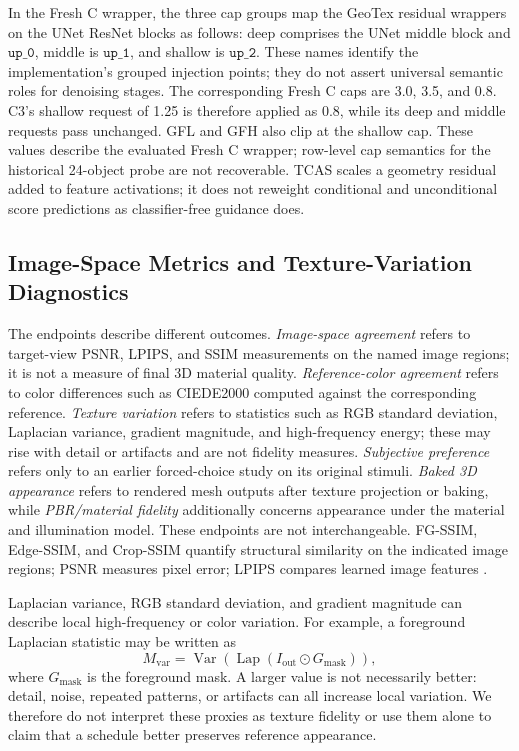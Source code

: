 \documentclass[times,twocolumn,final]{elsarticle}
\begin{document}
In the Fresh C wrapper, the three cap groups map the GeoTex residual wrappers on the UNet ResNet blocks as follows: deep comprises the UNet middle block and $\texttt{up\_0}$, middle is $\texttt{up\_1}$, and shallow is $\texttt{up\_2}$. These names identify the implementation's grouped injection points; they do not assert universal semantic roles for denoising stages. The corresponding Fresh C caps are 3.0, 3.5, and 0.8. C3's shallow request of 1.25 is therefore applied as 0.8, while its deep and middle requests pass unchanged. GFL and GFH also clip at the shallow cap. These values describe the evaluated Fresh C wrapper; row-level cap semantics for the historical 24-object probe are not recoverable. TCAS scales a geometry residual added to feature activations; it does not reweight conditional and unconditional score predictions as classifier-free guidance does.

\subsection{Image-Space Metrics and Texture-Variation Diagnostics}
\label{subsec:metrics}

The endpoints describe different outcomes. \emph{Image-space agreement} refers to target-view PSNR, LPIPS, and SSIM measurements on the named image regions; it is not a measure of final 3D material quality. \emph{Reference-color agreement} refers to color differences such as CIEDE2000 computed against the corresponding reference. \emph{Texture variation} refers to statistics such as RGB standard deviation, Laplacian variance, gradient magnitude, and high-frequency energy; these may rise with detail or artifacts and are not fidelity measures. \emph{Subjective preference} refers only to an earlier forced-choice study on its original stimuli. \emph{Baked 3D appearance} refers to rendered mesh outputs after texture projection or baking, while \emph{PBR/material fidelity} additionally concerns appearance under the material and illumination model. These endpoints are not interchangeable. FG-SSIM, Edge-SSIM, and Crop-SSIM quantify structural similarity on the indicated image regions; PSNR measures pixel error; LPIPS compares learned image features \cite{wang2004ssim,zhang2018lpips}.

Laplacian variance, RGB standard deviation, and gradient magnitude can describe local high-frequency or color variation. For example, a foreground Laplacian statistic may be written as
\begin{equation}
M_{\mathrm{var}}=\operatorname{Var}\!\left(\operatorname{Lap}(I_{\mathrm{out}}\odot G_{\mathrm{mask}})\right),
\end{equation}
where $G_{\mathrm{mask}}$ is the foreground mask. A larger value is not necessarily better: detail, noise, repeated patterns, or artifacts can all increase local variation. We therefore do not interpret these proxies as texture fidelity or use them alone to claim that a schedule better preserves reference appearance.
\end{document}
